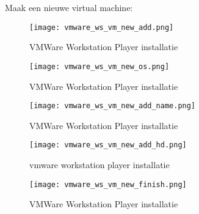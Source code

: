 Maak een nieuwe virtual machine:

\begin{figure}[H]
	\centering
	\texttt{[image: vmware\_ws\_vm\_new\_add.png]}
	\caption{VMWare Workstation Player installatie}
	\label{VW_ws_install}
\end{figure}

\begin{figure}[H]
	\centering
	\texttt{[image: vmware\_ws\_vm\_new\_os.png]}
	\caption{VMWare Workstation Player installatie}
	\label{VW_ws_install}
\end{figure}

\begin{figure}[H]
	\centering
	\texttt{[image: vmware\_ws\_vm\_new\_add\_name.png]}
	\caption{VMWare Workstation Player installatie}
	\label{VW_ws_install}
\end{figure}

\begin{figure}[h]
	\centering
	\texttt{[image: vmware\_ws\_vm\_new\_add\_hd.png]}
	\caption{vmware workstation player installatie}
	\label{vw_ws_install}
\end{figure}

\begin{figure}[H]
	\centering
	\texttt{[image: vmware\_ws\_vm\_new\_finish.png]}
	\caption{VMWare Workstation Player installatie}
	\label{VW_ws_install}
\end{figure}

